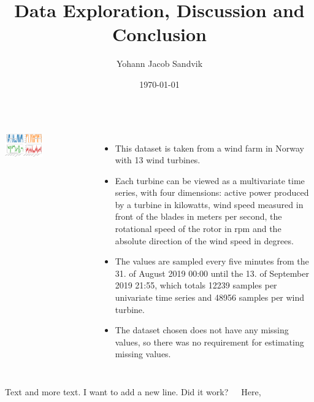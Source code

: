 \documentclass[18pt, a3paper, portrait]{tikzposter}
\title{Data Exploration, Discussion and Conclusion}
\author{Yohann Jacob Sandvik}
\date{\today}
\institute{Institute of Electronic Systems - NTNU}
\begin{document}
 
\maketitle 

\begin{columns}
    {
        \begin{tikzfigure}
            \includegraphics[width=0.45\textwidth]{images/one_turbine_all_vals.png}
        \end{tikzfigure}
    }
 
    {
        \begin{itemize}
            \item This dataset is taken from a wind farm in Norway with 13 wind turbines.
            \item Each turbine can be viewed as a multivariate time series, with four dimensions: active power produced by a turbine in kilowatts, wind speed measured in front of the blades in meters per second, the rotational speed of the rotor in rpm and the absolute direction of the wind speed in degrees.
            \item The values are sampled every five minutes from the 31. of August 2019 00:00 until the 13. of September 2019 21:55, which totals 12239 samples per univariate time series and 48956 samples per wind turbine.
            \item The dataset chosen does not have any missing values, so there was no requirement for estimating missing values.
        \end{itemize}
        \vspace{4cm}
    }
\end{columns}

\begin{columns}
    \block{}
    {
        Text and more text. I want to add a new line. \newline
        Did it work?
        \vspace{4cm}
    }
 
    \block{}
    {
        Here,  
        \vspace{4cm}
    }
\end{columns}
\end{document}
